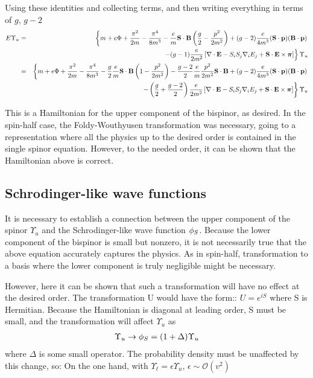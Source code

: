 Using these identities and collecting terms, and then writing everything in terms of $g$, $g-2$
\begin{eqnarray*}
	E \Upsilon_u 
		&=&\left\{ m + e\Phi + \frac{\pi^2}{2m} - \frac{\pi^4 } {8m^3}
			- \frac{e}{m} \mathbf{S} \cdot \mathbf{B} \left ( \frac{g}{2} - \frac{p^2}{2m^2} \right )
			+ (g-2)\frac{e}{4m^3} (\mathbf{S} \cdot \mathbf{p}) (\mathbf{B} \cdot \mathbf{p})	\right. \\
		&&	\left.
			- (g-1)\frac{e}{2m^2} 
				\left [ 
					\mathbf{\nabla} \cdot \mathbf{E} 
					- S_i S_j \nabla_i E_j +\mathbf{S} \cdot \mathbf{E} \times \mbox{\boldmath$ \pi $}
				\right ]
			\right\}\Upsilon_u	\\
		&=& \left\{ m + e\Phi + \frac{\pi^2}{2m} - \frac{\pi^4 } {8m^3}
			- \frac{g}{2}\frac{e}{m} \mathbf{S} \cdot \mathbf{B} \left ( 1 - \frac{p^2}{2m^2} \right )
			- \frac{g-2}{2} \frac{e}{m} \frac{p^2}{2m^2} \mathbf{S} \cdot \mathbf{B} 
			+ (g-2)\frac{e}{4m^3} (\mathbf{S} \cdot \mathbf{p}) (\mathbf{B} \cdot \mathbf{p})	\right.	\\
		&&	\left.
			- \left ( \frac{g}{2} + \frac{g-2}{2} \right) \frac{e}{2m^2} 
				\left [ 
					\mathbf{\nabla} \cdot \mathbf{E} 
					- S_i S_j \nabla_i E_j +\mathbf{S} \cdot \mathbf{E} \times \mbox{\boldmath$ \pi $}
				\right ]
			\right\}\Upsilon_u
\end{eqnarray*}
			
This is a Hamiltonian for the upper component of the bispinor, as desired.  In the spin-half case, the Foldy-Wouthyusen transformation was necessary, going to a representation where all the physics up to the desired order is contained in the single spinor equation.  However, to the needed order, it can be shown that the Hamiltonian above is correct.


\subsection{Schrodinger-like wave functions}
It is necessary to establish a connection between the upper component of the spinor $\Upsilon_u$ and the Schrodinger-like wave function $\phi_S$.  Because the lower component of the bispinor is small but nonzero, it is not necessarily true that the above equation accurately captures the physics.  As in spin-half, transformation to a basis where the lower component is truly negligible might be necessary.

However, here it can be shown that such a transformation will have no effect at the desired order.  The transformation U would have the form::
 $U = e^{iS} $ where S is Hermitian.  Because the Hamiltonian is diagonal at leading order, S must be small, and the transformation will affect $\Upsilon_u$ as
\begin{eqnarray*} 
\Upsilon_u \to \phi_S = (1 + \Delta)\Upsilon_u 
\end{eqnarray*}
where $\Delta$ is some small operator.  The probability density must be unaffected by this change, so:
On the one hand, with $\Upsilon_\ell = \epsilon \Upsilon_u$, $ \epsilon \sim \mathcal{O}(v^2) $

